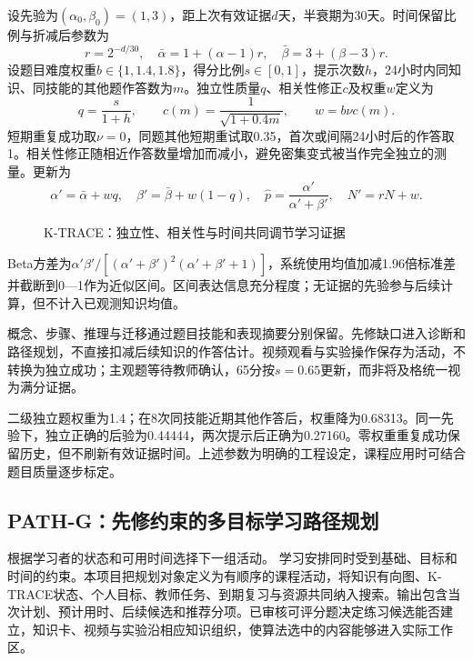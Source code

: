 \documentclass[UTF8,zihao=-4,fontset=none,a4paper]{ctexart}
\newcommand{\diagram}[2]{\par\begin{figure}[htbp]\centering\caption{#2}\end{figure}\par}
\begin{document}
设先验为$(\alpha_0,\beta_0)=(1,3)$，距上次有效证据$d$天，半衰期为30天。时间保留比例与折减后参数为
\begin{equation}
r=2^{-d/30},\quad \bar\alpha=1+(\alpha-1)r,\quad
\bar\beta=3+(\beta-3)r .
\end{equation}
设题目难度权重$b\in\{1,1.4,1.8\}$，得分比例$s\in[0,1]$，提示次数$h$，24小时内同知识、同技能的其他题作答数为$m$。独立性质量$q$、相关性修正$c$及权重$w$定义为
\begin{equation}
q=\frac{s}{1+h},\qquad c(m)=\frac{1}{\sqrt{1+0.4m}},\qquad w=b\nu c(m).
\end{equation}
短期重复成功取$\nu=0$，同题其他短期重试取0.35，首次或间隔24小时后的作答取1。相关性修正随相近作答数量增加而减小，避免密集变式被当作完全独立的测量。更新为
\begin{equation}
\alpha'=\bar\alpha+wq,\quad \beta'=\bar\beta+w(1-q),\quad
\hat p=\frac{\alpha'}{\alpha'+\beta'},\quad N'=rN+w .
\end{equation}
\diagram{evidence}{K-TRACE：独立性、相关性与时间共同调节学习证据}
Beta方差为$\alpha'\beta'/[(\alpha'+\beta')^2(\alpha'+\beta'+1)]$，系统使用均值加减1.96倍标准差并截断到0—1作为近似区间\cite{stan}。区间表达信息充分程度；无证据的先验参与后续计算，但不计入已观测知识均值。

概念、步骤、推理与迁移通过题目技能和表现摘要分别保留。先修缺口进入诊断和路径规划，不直接扣减后续知识的作答估计。视频观看与实验操作保存为活动，不转换为独立成功；主观题等待教师确认，65分按$s=0.65$更新，而非将及格统一视为满分证据。

二级独立题权重为1.4；在8次同技能近期其他作答后，权重降为0.68313。同一先验下，独立正确的后验为0.44444，两次提示后正确为0.27160。零权重重复成功保留历史，但不刷新有效证据时间。上述参数为明确的工程设定，课程应用时可结合题目质量逐步标定。

\subsection{PATH-G：先修约束的多目标学习路径规划}
\methodPathG{}根据学习者的状态和可用时间选择下一组活动。
学习安排同时受到基础、目标和时间的约束。本项目把规划对象定义为有顺序的课程活动，将知识有向图、K-TRACE状态、个人目标、教师任务、到期复习与资源共同纳入搜索。输出包含当次计划、预计用时、后续候选和推荐分项。已审核可评分题决定练习候选能否建立，知识卡、视频与实验沿相应知识组织，使算法选中的内容能够进入实际工作区。
\end{document}
